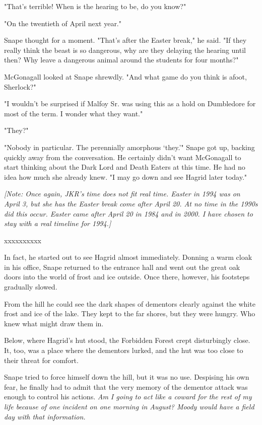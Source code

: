 \documentclass[a4paper,11pt]{article}
\begin{document}
"That's terrible! When is the hearing to be, do you know?"

"On the twentieth of April next year."

Snape thought for a moment. "That's after the Easter break," he said. "If they really think the beast is so dangerous, why are they delaying the hearing until then? Why leave a dangerous animal around the students for four months?"

McGonagall looked at Snape shrewdly. "And what game do you think is afoot, Sherlock?"

"I wouldn't be surprised if Malfoy Sr. was using this as a hold on Dumbledore for most of the term. I wonder what they want."

"They?"

"Nobody in particular. The perennially amorphous `they.'" Snape got up, backing quickly away from the conversation. He certainly didn't want McGonagall to start thinking about the Dark Lord and Death Eaters at this time. He had no idea how much she already knew. "I may go down and see Hagrid later today."

\emph{[Note: Once again, JKR's time does not fit real time. Easter in 1994 was on April 3, but she has the Easter break come after April 20. At no time in the 1990s did this occur. Easter came after April 20 in 1984 and in 2000. I have chosen to stay with a real timeline for 1994.]}

xxxxxxxxxx

In fact, he started out to see Hagrid almost immediately. Donning a warm cloak in his office, Snape returned to the entrance hall and went out the great oak doors into the world of frost and ice outside. Once there, however, his footsteps gradually slowed.

From the hill he could see the dark shapes of dementors clearly against the white frost and ice of the lake. They kept to the far shores, but they were hungry. Who knew what might draw them in.

Below, where Hagrid's hut stood, the Forbidden Forest crept disturbingly close. It, too, was a place where the dementors lurked, and the hut was too close to their threat for comfort.

Snape tried to force himself down the hill, but it was no use. Despising his own fear, he finally had to admit that the very memory of the dementor attack was enough to control his actions. \emph{Am I going to act like a coward for the rest of my life because of one incident on one morning in August? Moody would have a field day with that information.}
\end{document}
